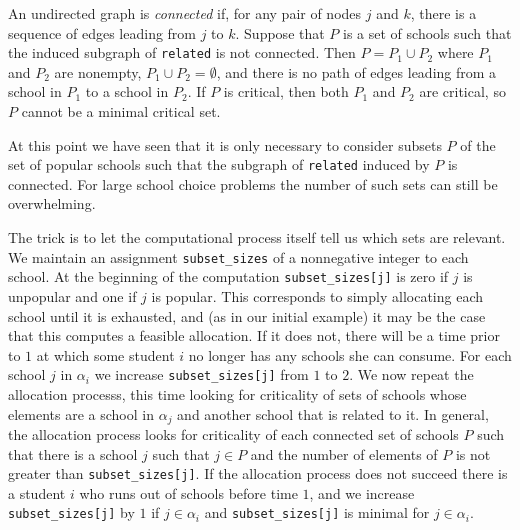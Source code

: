 \documentclass[12pt]{article}
\theoremstyle{definition}
\begin{document}
An undirected graph is \emph{connected} if, for any pair of nodes $j$
and $k$, there is a sequence of edges leading from $j$ to $k$.
Suppose that $P$ is a set of schools such that the induced subgraph of
\texttt{related} is not connected.  Then $P = P_1 \cup P_2$ where
$P_1$ and $P_2$ are nonempty, $P_1 \cup P_2 = \emptyset$, and there is
no path of edges leading from a school in $P_1$ to a school in $P_2$.
If $P$ is critical, then both $P_1$ and $P_2$ are critical, so $P$
cannot be a minimal critical set.

At this point we have seen that it is only necessary to consider
subsets $P$ of the set of popular schools such that the subgraph of
\texttt{related} induced by $P$ is connected.  For large school choice
problems the number of such sets can still be overwhelming.

The trick is to let the computational process itself tell us which
sets are relevant.  We maintain an assignment \texttt{subset\_sizes}
of a nonnegative integer to each school.  At the beginning of the
computation \texttt{subset\_sizes[j]} is zero if $j$ is unpopular and
one if $j$ is popular.  This corresponds to simply allocating each
school until it is exhausted, and (as in our initial example) it may
be the case that this computes a feasible allocation.  If it does not,
there will be a time prior to $1$ at which some student $i$ no longer
has any schools she can consume.  For each school $j$ in $\alpha_i$ we
increase \texttt{subset\_sizes[j]} from $1$ to $2$.  We now repeat the
allocation processs, this time looking for criticality of sets of
schools whose elements are a school in $\alpha_j$ and another school
that is related to it.  In general, the allocation process looks for
criticality of each connected set of schools $P$ such that there is a school
$j$ such that $j \in P$ and the number of elements of $P$ is not
greater than \texttt{subset\_sizes[j]}.  If the allocation process
does not succeed there is a student $i$ who runs out of schools before
time $1$, and we increase \texttt{subset\_sizes[j]} by $1$ if $j \in
\alpha_i$ and \texttt{subset\_sizes[j]} is minimal for $j \in
\alpha_i$.
\end{document}
